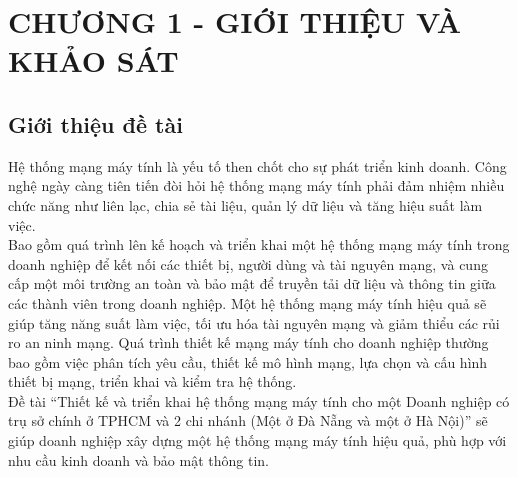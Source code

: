 \documentclass[12pt,a4paper]{report}
\begin{document}
\section*{CHƯƠNG 1 - GIỚI THIỆU VÀ KHẢO SÁT}

\setcounter{section}{1}
\setcounter{subsection}{0}
\setcounter{figure}{0}
\setcounter{table}{0}
\subsection{Giới thiệu đề tài}
Hệ thống mạng máy tính là yếu tố then chốt cho sự phát triển kinh doanh. Công nghệ ngày càng tiên tiến đòi hỏi hệ thống mạng máy tính phải đảm nhiệm nhiều chức năng như liên lạc, chia sẻ tài liệu, quản lý dữ liệu và tăng hiệu suất làm việc.\\
\hspace*{1cm}Bao gồm quá trình lên kế hoạch và triển khai một hệ thống mạng máy tính trong doanh nghiệp để kết nối các thiết bị, người dùng và tài nguyên mạng, và cung cấp một môi trường an toàn và bảo mật để truyền tải dữ liệu và thông tin giữa các thành viên trong doanh nghiệp. Một hệ thống mạng máy tính hiệu quả sẽ giúp tăng năng suất làm việc, tối ưu hóa tài nguyên mạng và giảm thiểu các rủi ro an ninh mạng. Quá trình thiết kế mạng máy tính cho doanh nghiệp thường bao gồm việc phân tích yêu cầu, thiết kế mô hình mạng, lựa chọn và cấu hình thiết bị mạng, triển khai và kiểm tra hệ thống.\\
\hspace*{1cm}Đề tài “Thiết kế và triển khai hệ thống mạng máy tính cho một Doanh nghiệp có trụ sở chính ở TPHCM và 2 chi nhánh (Một ở Đà Nẵng và một ở Hà Nội)” sẽ giúp doanh nghiệp xây dựng một hệ thống mạng máy tính hiệu quả, phù hợp với nhu cầu kinh doanh và bảo mật thông tin.
\end{document}
